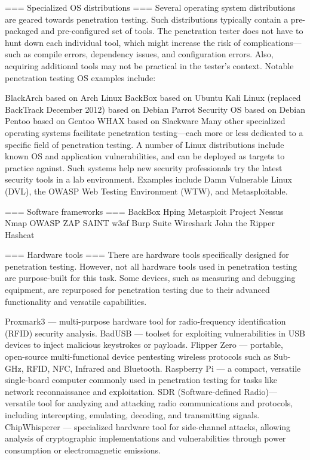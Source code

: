 === Specialized OS distributions ===
Several operating system distributions are geared towards penetration testing. Such distributions typically contain a pre-packaged and pre-configured set of tools. The penetration tester does not have to hunt down each individual tool, which might increase the risk of complications—such as compile errors, dependency issues, and configuration errors. Also, acquiring additional tools may not be practical in the tester's context.
Notable penetration testing OS examples include:

BlackArch based on Arch Linux
BackBox based on Ubuntu
Kali Linux (replaced BackTrack December 2012) based on Debian
Parrot Security OS based on Debian
Pentoo based on Gentoo
WHAX based on Slackware
Many other specialized operating systems facilitate penetration testing—each more or less dedicated to a specific field of penetration testing. A number of Linux distributions include known OS and application vulnerabilities, and can be deployed as targets to practice against. Such systems help new security professionals try the latest security tools in a lab environment. Examples include Damn Vulnerable Linux (DVL), the OWASP Web Testing Environment (WTW), and Metasploitable.


=== Software frameworks ===
BackBox
Hping
Metasploit Project
Nessus
Nmap
OWASP ZAP
SAINT
w3af
Burp Suite
Wireshark
John the Ripper
Hashcat


=== Hardware tools ===
There are hardware tools specifically designed for penetration testing. However, not all hardware tools used in penetration testing are purpose-built for this task. Some devices, such as measuring and debugging equipment, are repurposed for penetration testing due to their advanced functionality and versatile capabilities.

Proxmark3 — multi-purpose hardware tool for radio-frequency identification (RFID) security analysis.
BadUSB — toolset for exploiting vulnerabilities in USB devices to inject malicious keystrokes or payloads.
Flipper Zero —  portable, open-source multi-functional device pentesting wireless protocols such as Sub-GHz, RFID, NFC, Infrared and Bluetooth.
Raspberry Pi — a compact, versatile single-board computer commonly used in penetration testing for tasks like network reconnaissance and exploitation.
SDR (Software-defined Radio)— versatile tool for analyzing and attacking radio communications and protocols, including intercepting, emulating, decoding, and transmitting signals.
ChipWhisperer — specialized hardware tool for side-channel attacks, allowing analysis of cryptographic implementations and vulnerabilities through power consumption or electromagnetic emissions.


